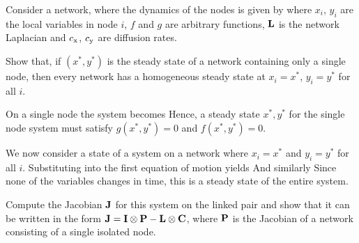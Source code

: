 Consider a network, where the dynamics of the nodes is given by
where $x_i$, $y_i$ are the local variables in node $i$, $f$ and $g$ are arbitrary functions, $\bf L$ is the network Laplacian and $c_{\rm x}$, $c_{\rm y}$ are diffusion rates.

\subquestion 
Show that, if $(x^*,y^*)$ is the steady state of a network containing only a single node, then every network has a homogeneous steady state at $x_i=x^*$, $y_i = y^*$ for all $i$.   

\solution
On a single node the system becomes 
Hence, a steady state $x^*,y^*$ for the single node system  must satisfy $g(x^*,y^*)=0$ and $f(x^*,y^*)=0$. 

We now consider a state of a system on a network where $x_i=x^*$ and $y_i=y^*$ for all $i$. Substituting into the first equation of motion yields 
And similarly 
Since none of the variables changes in time, this is a steady state of the entire system.

\subquestion 
Compute the Jacobian $\bf J$ for this system on the linked pair and show that it can be written in the form ${\bf J}={\bf I}\otimes {\bf P}-{\bf L}\otimes {\bf C}$, where $\bf P$ is the Jacobian of a network consisting of a single isolated node. 

